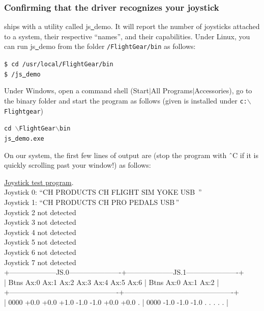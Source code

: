 \subsubsection{Confirming that the driver recognizes your joystick\label{confirming}}
\FlightGear{} ships with a utility called js\underline{~}demo. It will report the number of joysticks attached to a system, their respective ``names'', and their capabilities. Under Linux, you can run js\underline{~}demo from the folder \texttt{/FlightGear/bin} as follows:
\medskip

\noindent
	\texttt{\$ cd /usr/local/FlightGear/bin}\\	
	\texttt{\$ \./js\underline{~}demo}
\medskip

\noindent
Under Windows, open a command shell (Start$\left|\right.$All Programs$\left|\right.$Accessories), go to the \FlightGear{} binary folder and start the program as follows (given \FlightGear{} is installed under \texttt{c:$\backslash$Flightgear})
\medskip

\noindent
	\texttt{cd {$\backslash$}FlightGear{$\backslash$}bin}\\	
	\texttt{js\underline{~}demo.exe}
\medskip

On our system, the first few lines of output are (stop the program with \^{~}C if it is quickly scrolling  past your window!) as follows:
\medskip

\begin{ttfamily}
\tiny
\noindent
\underline{Joystick test program}.\\
Joystick 0: ``CH PRODUCTS CH FLIGHT SIM YOKE USB\, ''\\
Joystick 1: ``CH PRODUCTS CH PRO PEDALS USB\,''\\
Joystick 2 not detected\\
Joystick 3 not detected\\
Joystick 4 not detected\\
Joystick 5 not detected\\
Joystick 6 not detected\\
Joystick 7 not detected\\
+--------------------JS.0----------------------+--------------------JS.1----------------------+\\
| Btns Ax:0 Ax:1 Ax:2 Ax:3 Ax:4 Ax:5 Ax:6      | Btns Ax:0 Ax:1 Ax:2                          |\\
+----------------------------------------------+----------------------------------------------+\\
| 0000 +0.0 +0.0 +1.0 -1.0 -1.0 +0.0 +0.0   .  | 0000 -1.0 -1.0 -1.0   .    .    .    .    .  |\\
\end{ttfamily}

